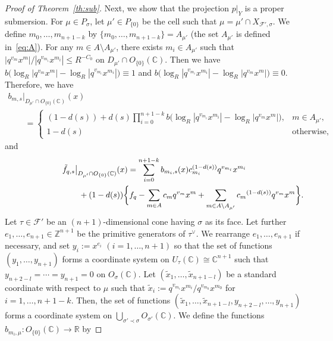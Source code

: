 \documentclass[pdftex]{sigma}
\numberwithin{equation}{section}
\begin{document}
\begin{proof}[Proof of Theorem~\ref{th:sub}]
Next, we show that the projection $\left. p \right|_Y$ is a proper submersion. For $\mu \in P_\sigma$, let $\mu' \in P_{\{0\}}$ be the cell such that $\mu = \mu' \cap X_{{\mathcal F}',\sigma}$. We def\/ine $m_0, \dots, m_{n+1-k}$ by $\{m_0, \dots, m_{n+1-k}\} =A_{\mu'}$ (the set $A_{\mu'}$ is def\/ined in~\eqref{eq:A}). For any $m \in A \setminus A_{\mu'}$, there exists $m_i \in A_{\mu'}$ such that $|q^{v_{m}}x^{m}|/|{q^{v_{m_i}}x^{m_i}}| \leq R^{-C_0}$ on $D_{\mu'} \cap O_{\{0\}}({\mathbb C})$. Then we have $b\big(\log_R|q^{v_{m}}x^{m}|-\log_R|{q^{v_{m_i}}x^{m_i}}|\big) \equiv 1$ and $b\big(\log_R|q^{v_{m_i}}x^{m_i}|-\log_R|{q^{v_{m}}x^{m}}|\big) \equiv 0$. Therefore, we have
\begin{gather*}
 b_{m,s} |_{D_{\mu'} \cap O_{\{0\}}({\mathbb C})}(x)\\
 \qquad{} =
\begin{cases}
(1-d(s))+d(s)\prod\limits_{i=0}^{n+1-k} b \big( \log_R|q^{v_{m_i}}x^{m_i}|-\log_R|{q^{v_{m}}x^{m}}| \big), & m \in A_{\mu'}, \\
1-d(s) &\mathrm{otherwise,}
\end{cases}
\end{gather*}
and
\begin{gather}
 \tilde{f}_{q,s} \big|_{D_{\mu'} \cap O_{\{0\}}({\mathbb C})}(x)= \sum_{i=0}^{n+1-k} b_{m_i,s}(x)c_{m_i}^{(1-d(s))}q^{v_{m_i}}x^{m_i}\nonumber\\
\hphantom{\tilde{f}_{q,s} \big|_{D_{\mu'} \cap O_{\{0\}}({\mathbb C})}(x)=}{}
+(1-d(s))\bigg\{ f_{q}-\sum_{m \in A}{c_{m}}q^{v_{m}}x^{m}+\sum_{m \in A \setminus A_{\mu'}}{c_{m}}^{(1-d(s))}q^{v_{m}}x^{m}\bigg\}.\label{eq:a}
\end{gather}
Let $\tau \in {\mathcal F}'$ be an $(n+1)$-dimensional cone having $\sigma$ as its face. Let further $e_1, \dots, e_{n+1} \in {\mathbb Z}^{n+1}$ be the primitive generators of $\tau^\vee$. We rearrange $e_1, \dots, e_{n+1}$ if necessary, and set $y_i:=x^{e_i}$ $(i=1,\dots, n+1)$ so that the set of functions $(y_1, \dots, y_{n+1})$ forms a coordinate system on $U_\tau({\mathbb C}) \cong {\mathbb C}^{n+1}$ such that $y_{n+2-l}= \cdots =y_{n+1}=0$ on $O_\sigma({\mathbb C})$. Let $(\tilde{x}_1, \dots, \tilde{x}_{n+1-l})$ be a standard coordinate with respect to $\mu$ such that $\tilde{x}_i:=q^{v_{m_i}}x^{m_i}/q^{v_{m_0}}x^{m_0}$ for $i=1, \dots, n+1-k$. Then, the set of functions $(\tilde{x}_1, \dots, \tilde{x}_{n+1-l}, y_{n+2-l}, \dots, y_{n+1})$ forms a coordinate system on $\bigcup_{\sigma' \prec \sigma} O_{\sigma'}({\mathbb C})$. We def\/ine the functions $b_{m_i,\mu} \colon O_{\{0\}}({\mathbb C}) \to {\mathbb R}$ by

\end{proof}
\end{document}
